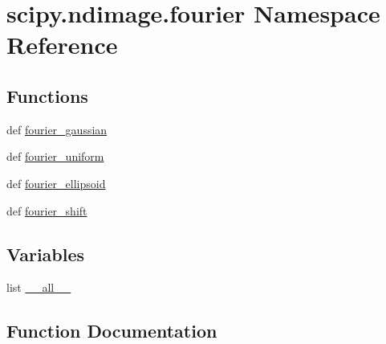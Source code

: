 \hypertarget{namespacescipy_1_1ndimage_1_1fourier}{}\section{scipy.\+ndimage.\+fourier Namespace Reference}
\label{namespacescipy_1_1ndimage_1_1fourier}
\subsection*{Functions}
\begin{DoxyCompactItemize}
\item 
def \hyperlink{namespacescipy_1_1ndimage_1_1fourier_a03addb66552dc7121367fa484bd3a178}{fourier\+\_\+gaussian}
\item 
def \hyperlink{namespacescipy_1_1ndimage_1_1fourier_afa58ebd82dda821d1c19b752e799f56e}{fourier\+\_\+uniform}
\item 
def \hyperlink{namespacescipy_1_1ndimage_1_1fourier_abff113b1ce4b9d13cd5640a5b499d2c3}{fourier\+\_\+ellipsoid}
\item 
def \hyperlink{namespacescipy_1_1ndimage_1_1fourier_ab6f6c0b190ab0cfe75b863af02d3d1aa}{fourier\+\_\+shift}
\end{DoxyCompactItemize}
\subsection*{Variables}
\begin{DoxyCompactItemize}
\item 
list \hyperlink{namespacescipy_1_1ndimage_1_1fourier_a3083302dd8ea5b2bc4f3c94d8b3d0976}{\+\_\+\+\_\+all\+\_\+\+\_\+}
\end{DoxyCompactItemize}


\subsection{Function Documentation}
\hypertarget{namespacescipy_1_1ndimage_1_1fourier_abff113b1ce4b9d13cd5640a5b499d2c3}{}
